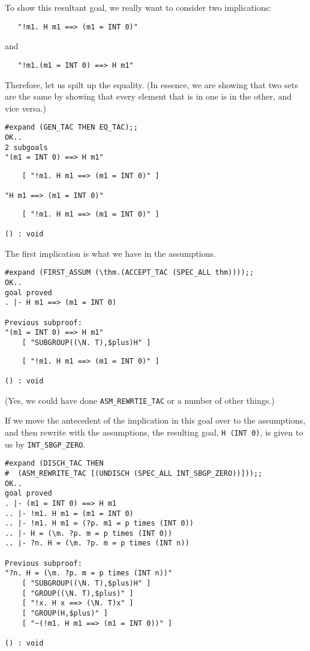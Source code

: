 To show this resultant goal, we really want to consider two implications:
\begin{verbatim}
   "!m1. H m1 ==> (m1 = INT 0)"
\end{verbatim}
and
\begin{verbatim}
   "!m1.(m1 = INT 0) ==> H m1"
\end{verbatim}
Therefore, let us spilt up the equality.  (In essence, we are showing
that two sets are the same by showing that every element that is in
one is in the other, and vice versa.)
\begin{session}
\begin{verbatim}
#expand (GEN_TAC THEN EQ_TAC);;
OK..
2 subgoals
"(m1 = INT 0) ==> H m1"
\end{verbatim}
\mvdots
\begin{verbatim}
    [ "!m1. H m1 ==> (m1 = INT 0)" ]

"H m1 ==> (m1 = INT 0)"
\end{verbatim}
\mvdots
\begin{verbatim}
    [ "!m1. H m1 ==> (m1 = INT 0)" ]

() : void
\end{verbatim}
\end{session}

The first implication is what we have in the assumptions.
\begin{session}
\begin{verbatim}
#expand (FIRST_ASSUM (\thm.(ACCEPT_TAC (SPEC_ALL thm))));;
OK..
goal proved
. |- H m1 ==> (m1 = INT 0)

Previous subproof:
"(m1 = INT 0) ==> H m1"
    [ "SUBGROUP((\N. T),$plus)H" ]
\end{verbatim}
\mvdots
\begin{verbatim}
    [ "!m1. H m1 ==> (m1 = INT 0)" ]

() : void
\end{verbatim}
\end{session}
(Yes, we could have done {\small\verb+ASM_REWRTIE_TAC+} or a number of other
things.) 

If we move the antecedent of the implication in this goal over to the
assumptions, and then rewrite with the assumptions, the resulting goal,
{\small\verb+H (INT 0)+}, is given to us by {\small\verb+INT_SBGP_ZERO+}.

\newpage %

\begin{session}
\begin{verbatim}
#expand (DISCH_TAC THEN
#  (ASM_REWRITE_TAC [(UNDISCH (SPEC_ALL INT_SBGP_ZERO))]));;
OK..
goal proved
. |- (m1 = INT 0) ==> H m1
.. |- !m1. H m1 = (m1 = INT 0)
.. |- !m1. H m1 = (?p. m1 = p times (INT 0))
.. |- H = (\m. ?p. m = p times (INT 0))
.. |- ?n. H = (\m. ?p. m = p times (INT n))

Previous subproof:
"?n. H = (\m. ?p. m = p times (INT n))"
    [ "SUBGROUP((\N. T),$plus)H" ]
    [ "GROUP((\N. T),$plus)" ]
    [ "!x. H x ==> (\N. T)x" ]
    [ "GROUP(H,$plus)" ]
    [ "~(!m1. H m1 ==> (m1 = INT 0))" ]

() : void
\end{verbatim}
\end{session}


